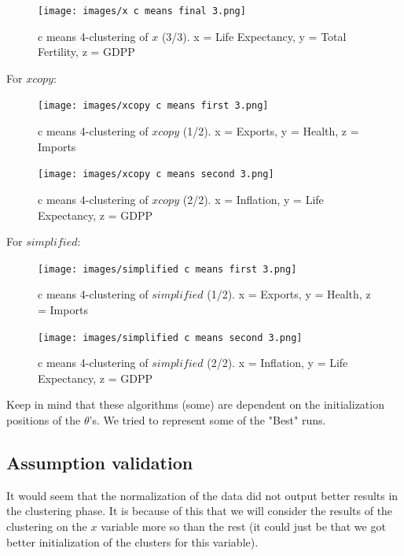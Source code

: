 \documentclass[12pt, a4paper]{article}
\begin{document}
\begin{figure}[H]
    \centering
    \texttt{[image: images/x c means final 3.png]}
    \caption{c means 4-clustering of $x$ (3/3). x = Life Expectancy, y = Total Fertility, z = GDPP}
    \label{fig:ncopy-optimal}
\end{figure}

For $xcopy$:

\begin{figure}[H]
    \centering
    \texttt{[image: images/xcopy c means first 3.png]}
    \caption{c means 4-clustering of $xcopy$ (1/2). x = Exports, y = Health, z = Imports}
    \label{fig:ncopy-optimal}
\end{figure}

\begin{figure}[H]
    \centering
    \texttt{[image: images/xcopy c means second 3.png]}
    \caption{c means 4-clustering of $xcopy$ (2/2). x = Inflation, y = Life Expectancy, z = GDPP}
    \label{fig:ncopy-optimal}
\end{figure}

For $simplified$:

\begin{figure}[H]
    \centering
    \texttt{[image: images/simplified c means first 3.png]}
    \caption{c means 4-clustering of $simplified$ (1/2). x = Exports, y = Health, z = Imports}
    \label{fig:ncopy-optimal}
\end{figure}

\begin{figure}[H]
    \centering
    \texttt{[image: images/simplified c means second 3.png]}
    \caption{c means 4-clustering of $simplified$ (2/2). x = Inflation, y = Life Expectancy, z = GDPP}
    \label{fig:ncopy-optimal}
\end{figure}

Keep in mind that these algorithms (some) are dependent on the initialization positions of the $\theta$'s. We tried to represent some of the "Best" runs.

\subsection{Assumption validation}

It would seem that the normalization of the data did not output better results in the clustering phase. It is because of this that we will consider the results of the clustering on the $x$ variable more so than the rest (it could just be that we got better initialization of the clusters for this variable).
\end{document}
